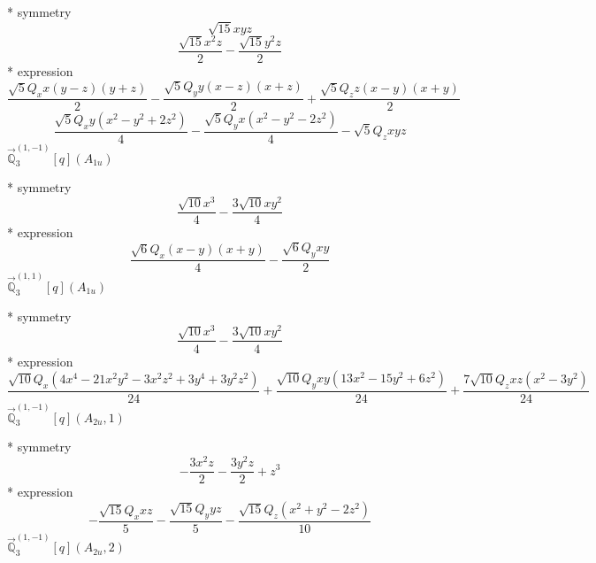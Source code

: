 \documentclass[fleqn,8pt]{jsarticle}
\begin{document}
\noindent\quad ** symmetry
\begin{dmath*}
\sqrt{15} x y z
\end{dmath*}
\begin{dmath*}
\frac{\sqrt{15} x^{2} z}{2} - \frac{\sqrt{15} y^{2} z}{2}
\end{dmath*}
\noindent\quad ** expression
\begin{dmath*}
\frac{\sqrt{5} Q_{x} x \left(y - z\right) \left(y + z\right)}{2} - \frac{\sqrt{5} Q_{y} y \left(x - z\right) \left(x + z\right)}{2} + \frac{\sqrt{5} Q_{z} z \left(x - y\right) \left(x + y\right)}{2}
\end{dmath*}
\begin{dmath*}
\frac{\sqrt{5} Q_{x} y \left(x^{2} - y^{2} + 2 z^{2}\right)}{4} - \frac{\sqrt{5} Q_{y} x \left(x^{2} - y^{2} - 2 z^{2}\right)}{4} - \sqrt{5} Q_{z} x y z
\end{dmath*}
\noindent\quad $\vec{\mathbb{Q}}_{3}^{(1,-1)}[q](A_{1u})$

\noindent\quad ** symmetry
\begin{dmath*}
\frac{\sqrt{10} x^{3}}{4} - \frac{3 \sqrt{10} x y^{2}}{4}
\end{dmath*}
\noindent\quad ** expression
\begin{dmath*}
\frac{\sqrt{6} Q_{x} \left(x - y\right) \left(x + y\right)}{4} - \frac{\sqrt{6} Q_{y} x y}{2}
\end{dmath*}
\noindent\quad $\vec{\mathbb{Q}}_{3}^{(1,1)}[q](A_{1u})$

\noindent\quad ** symmetry
\begin{dmath*}
\frac{\sqrt{10} x^{3}}{4} - \frac{3 \sqrt{10} x y^{2}}{4}
\end{dmath*}
\noindent\quad ** expression
\begin{dmath*}
\frac{\sqrt{10} Q_{x} \left(4 x^{4} - 21 x^{2} y^{2} - 3 x^{2} z^{2} + 3 y^{4} + 3 y^{2} z^{2}\right)}{24} + \frac{\sqrt{10} Q_{y} x y \left(13 x^{2} - 15 y^{2} + 6 z^{2}\right)}{24} + \frac{7 \sqrt{10} Q_{z} x z \left(x^{2} - 3 y^{2}\right)}{24}
\end{dmath*}
\noindent\quad $\vec{\mathbb{Q}}_{3}^{(1,-1)}[q](A_{2u},1)$

\noindent\quad ** symmetry
\begin{dmath*}
- \frac{3 x^{2} z}{2} - \frac{3 y^{2} z}{2} + z^{3}
\end{dmath*}
\noindent\quad ** expression
\begin{dmath*}
- \frac{\sqrt{15} Q_{x} x z}{5} - \frac{\sqrt{15} Q_{y} y z}{5} - \frac{\sqrt{15} Q_{z} \left(x^{2} + y^{2} - 2 z^{2}\right)}{10}
\end{dmath*}
\noindent\quad $\vec{\mathbb{Q}}_{3}^{(1,-1)}[q](A_{2u},2)$
\end{document}

